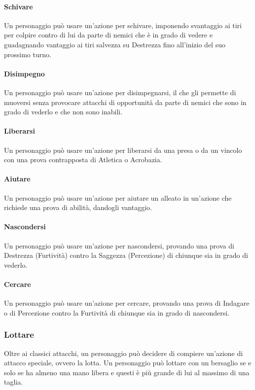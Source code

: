 \paragraph{Schivare}
Un personaggio può usare un'azione per schivare, imponendo svantaggio ai tiri per colpire contro di lui da parte di nemici che è in grado di vedere e guadagnando vantaggio ai tiri salvezza su Destrezza fino all'inizio del suo prossimo turno.\\
\paragraph{Disimpegno}
Un personaggio può usare un'azione per disimpegnarsi, il che gli permette di muoversi senza provocare attacchi di opportunità da parte di nemici che sono in grado di vederlo e che non sono inabili.\\
\paragraph{Liberarsi}
Un personaggio può usare un'azione per liberarsi da una presa o da un vincolo con una prova contrapposta di Atletica o Acrobazia.\\
\paragraph{Aiutare}
Un personaggio può usare un'azione per aiutare un alleato in un'azione che richiede una prova di abilità, dandogli vantaggio.\\
\paragraph{Nascondersi}
Un personaggio può usare un'azione per nascondersi, provando una prova di Destrezza (Furtività) contro la Saggezza (Percezione) di chiunque sia in grado di vederlo.\\
\paragraph{Cercare}
Un personaggio può usare un'azione per cercare, provando una prova di Indagare o di Percezione contro la Furtività di chiunque sia in grado di nascondersi.\\

\subsubsection{Lottare}
Oltre ai classici attacchi, un personaggio può decidere di compiere un'azione di attacco speciale, ovvero la lotta. Un personaggio può lottare con un bersaglio se e solo se ha almeno una mano libera e questi è più grande di lui al massimo di una taglia.\\
